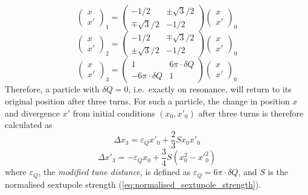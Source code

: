 \documentclass[a4paper,twoside,11pt]{report}
\begin{document}
\begin{equation}
  \begin{pmatrix}
    x\\x'
  \end{pmatrix}_1=
  \begin{pmatrix}
    -1/2 & \pm\sqrt{3}/2 \\
    \mp\sqrt{3}/2 & -1/2
  \end{pmatrix}\begin{pmatrix}
    x\\x'
  \end{pmatrix}_0
\end{equation}
\begin{equation}
  \begin{pmatrix}
    x\\x'
  \end{pmatrix}_2=
  \begin{pmatrix}
    -1/2 & \mp\sqrt{3}/2 \\
    \pm\sqrt{3}/2 & -1/2
  \end{pmatrix}\begin{pmatrix}
    x\\x'
  \end{pmatrix}_0
\end{equation}
\begin{equation}
  \begin{pmatrix}
    x\\x'
  \end{pmatrix}_3=
  \begin{pmatrix}
    1 & 6\pi\cdot\delta Q \\
    -6\pi\cdot\delta Q & 1
  \end{pmatrix}\begin{pmatrix}
    x\\x'
  \end{pmatrix}_0
\end{equation}
Therefore, a particle with $\delta Q=0$, i.e.\ exactly on resonance, will return to its original position after three turns. For such a particle, the change in position $x$ and divergence $x'$ from initial conditions $(x_0, x'_0)$ after three turns is therefore calculated as
\begin{equation}
  \Delta x_3 = {\varepsilon_Q} x'_0 + \frac 23 S x_0x'_0
  \label{eq:spiral_step}
\end{equation}
\begin{equation}
  \Delta x'_3 = -{\varepsilon_Q} x_0 + \frac 34 S (x_0^2-x'^2_0)
  \label{eq:spiral_kick}
\end{equation}
where ${\varepsilon_Q}$, the \textit{modified tune distance}, is defined as ${\varepsilon_Q} = 6\pi\cdot\delta Q$, and $S$ is the normalised sextupole strength (\autoref{eq:normalised_sextupole_strength}).
\end{document}

